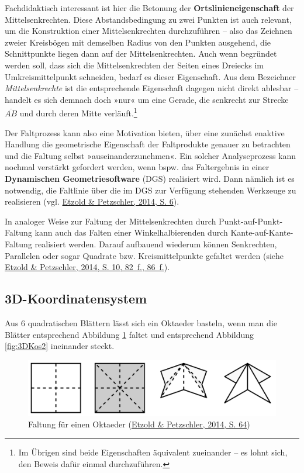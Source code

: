 \documentclass[
]{scrbook}
\theoremstyle{definition}
\theoremstyle{definition}
\theoremstyle{definition}
\theoremstyle{definition}
\theoremstyle{remark}
\begin{document}
Fachdidaktisch interessant ist hier die Betonung der \textbf{Ortslinieneigenschaft} der Mittelsenkrechten. Diese Abstandsbedingung zu zwei Punkten ist auch relevant, um die Konstruktion einer Mittelsenkrechten durchzuführen -- also das Zeichnen zweier Kreisbögen mit demselben Radius von den Punkten ausgehend, die Schnittpunkte liegen dann auf der Mittelsenkrechten. Auch wenn begründet werden soll, dass sich die Mittelsenkrechten der Seiten eines Dreiecks im Umkreismittelpunkt schneiden, bedarf es dieser Eigenschaft. Aus dem Bezeichner \emph{Mittelsenkrechte} ist die entsprechende Eigenschaft dagegen nicht direkt ablesbar -- handelt es sich demnach doch »nur« um eine Gerade, die senkrecht zur Strecke \(\overline{AB}\) und durch deren Mitte verläuft.\footnote{Im Übrigen sind beide Eigenschaften äquivalent zueinander -- es lohnt sich, den Beweis dafür einmal durchzuführen.}

Der Faltprozess kann also eine Motivation bieten, über eine zunächst enaktive Handlung die geometrische Eigenschaft der Faltprodukte genauer zu betrachten und die Faltung selbst »auseinanderzunehmen«. Ein solcher Analyseprozess kann nochmal verstärkt gefordert werden, wenn bspw. das Faltergebnis in einer \textbf{Dynamischen Geometriesoftware} (DGS) realisiert wird. Dann nämlich ist es notwendig, die Faltlinie über die im DGS zur Verfügung stehenden Werkzeuge zu realisieren (vgl. \protect\hyperlink{ref-Etzold2014a}{Etzold \& Petzschler, 2014, S. 6}).

In analoger Weise zur Faltung der Mittelsenkrechten durch Punkt-auf-Punkt-Faltung kann auch das Falten einer Winkelhalbierenden durch Kante-auf-Kante-Faltung realisiert werden. Darauf aufbauend wiederum können Senkrechten, Parallelen oder sogar Quadrate bzw. Kreismittelpunkte gefaltet werden (siehe \protect\hyperlink{ref-Etzold2014a}{Etzold \& Petzschler, 2014, S. 10, 82~f., 86~f.}).

\hypertarget{d-koordinatensystem}{%
\subsection{3D-Koordinatensystem}\label{d-koordinatensystem}}

Aus 6 quadratischen Blättern lässt sich ein Oktaeder basteln, wenn man die Blätter entsprechend Abbildung \ref{fig:3DKos1} faltet und entsprechend Abbildung \ref{fig:3DKos2} ineinander steckt.



\begin{figure}

{\centering \includegraphics[width=0.75\linewidth]{pictures/12-3DKos1} 

}

\caption{Faltung für einen Oktaeder (\protect\hyperlink{ref-Etzold2014a}{Etzold \& Petzschler, 2014, S. 64})}\label{fig:3DKos1}
\end{figure}
\end{document}
